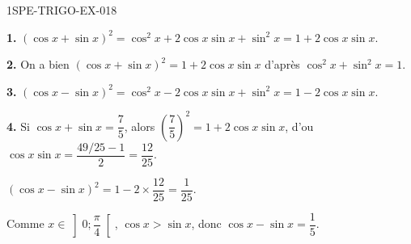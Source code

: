 \begin{corrige}{1SPE-TRIGO-EX-018}

\textbf{1.} $(\cos x + \sin x)^2 = \cos^2 x + 2\cos x\sin x + \sin^2 x = 1 + 2\cos x\sin x$.

\textbf{2.} On a bien $(\cos x + \sin x)^2 = 1 + 2\cos x\sin x$ d'après $\cos^2 x + \sin^2 x = 1$.

\textbf{3.} $(\cos x - \sin x)^2 = \cos^2 x - 2\cos x\sin x + \sin^2 x = 1 - 2\cos x\sin x$.

\textbf{4.} Si $\cos x + \sin x = \dfrac{7}{5}$, alors $\left(\dfrac{7}{5}\right)^2 = 1 + 2\cos x\sin x$, d'ou $\cos x\sin x = \dfrac{49/25 - 1}{2} = \dfrac{12}{25}$.

$(\cos x - \sin x)^2 = 1 - 2 \times \dfrac{12}{25} = \dfrac{1}{25}$.

Comme $x \in \left]0;\dfrac{\pi}{4}\right[$, $\cos x > \sin x$, donc $\cos x - \sin x = \dfrac{1}{5}$.

\end{corrige}
